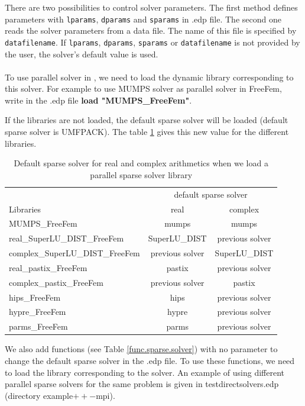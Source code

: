 \documentclass[a4paper,twoside,12pt]{book}
\begin{document}
There are two possibilities to control solver parameters. The first method defines parameters with \texttt{lparams},  \texttt{dparams} and  \texttt{sparams} in .edp file.
The second one reads  the solver parameters  from a data file. The name of this file  is specified by \texttt{datafilename}.
If \texttt{lparams},  \texttt{dparams},  \texttt{sparams}  or \texttt{datafilename} is not provided by the user, the solver's default value is used.
\\\\
To use  parallel solver in \freefempp, we need to load the dynamic library corresponding to this solver. For example to use
 MUMPS solver as parallel solver in FreeFem, write in the .edp file {\bf{load "MUMPS\_FreeFem"}}.

If the libraries are not loaded, the default sparse solver will be loaded (default sparse solver is UMFPACK). The table \ref{lib.sparse.solver} gives this new value for the different libraries.

\begin{table}[ht!]
\begin{tabular}{|l|c|c|}\hline
                                  & \multicolumn{2}{|c|}{default sparse solver }  \\
Libraries                      &         real    &  complex \\ \hline
MUMPS\_FreeFem &   mumps   &  mumps\\
real\_SuperLU\_DIST\_FreeFem  & SuperLU\_DIST  & previous solver \\
complex\_SuperLU\_DIST\_FreeFem      &  previous solver & SuperLU\_DIST \\
real\_pastix\_FreeFem &  pastix & previous solver \\
complex\_pastix\_FreeFem &previous solver & pastix \\
hips\_FreeFem       &  hips & previous solver \\
hypre\_FreeFem    & hypre & previous solver \\
parms\_FreeFem   & parms & previous solver \\
\hline
\end{tabular}
\caption{Default sparse solver for real and complex arithmetics when we load a parallel sparse solver library \label{lib.sparse.solver}}
\end{table}

We also add functions (see Table  \ref{func.sparse.solver}) with no parameter to change the default sparse solver in the .edp file. To use these functions, we need to load the library corresponding to the solver. An example of using different parallel sparse solvers for the same problem is given in testdirectsolvers.edp (directory example$++-$mpi).
\end{document}
